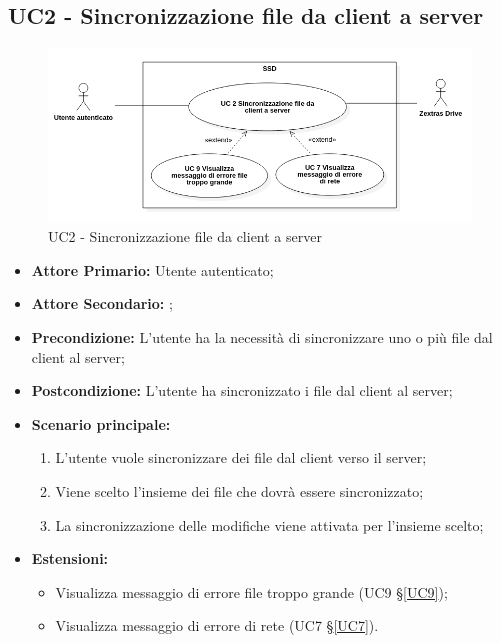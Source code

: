 \subsection{UC2 - Sincronizzazione file da client a server}
\begin{figure}[H]
    \centering
    \includegraphics[scale = 0.5]{components/img/UC2.png}
    \caption{UC2 - Sincronizzazione file da client a server}
\end{figure}
\begin{itemize}
\item \textbf{Attore Primario:} Utente autenticato;
\item \textbf{Attore Secondario:} ;
\item \textbf{Precondizione:} L'utente ha la necessità di sincronizzare uno o più file dal client al server;
\item \textbf{Postcondizione:} L'utente ha sincronizzato i file dal client al server;
\item \textbf{Scenario principale:}
\begin{enumerate}
\item L'utente vuole sincronizzare dei file dal client verso il server;
\item Viene scelto l'insieme dei file che dovrà essere sincronizzato;
\item La sincronizzazione delle modifiche viene attivata per l'insieme scelto;
\end{enumerate}
\item \textbf{Estensioni:}
    \begin{itemize}
    \item Visualizza messaggio di errore file troppo grande (UC9 \S{}\ref{UC9});
    \item Visualizza messaggio di errore di rete (UC7 \S{}\ref{UC7}).
    \end{itemize}
\end{itemize}
